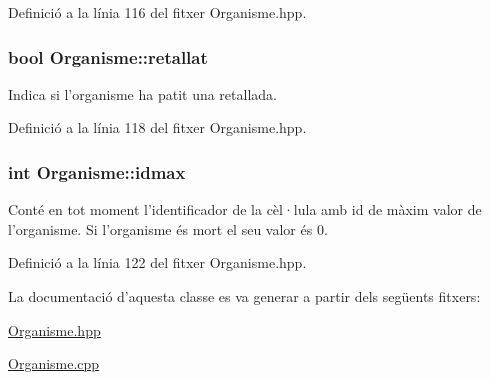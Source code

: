 Definició a la línia 116 del fitxer Organisme.\-hpp.

\hypertarget{class_organisme_acf912225a83570cb68542dcc6709023a}{
\subsubsection[{retallat}]{\setlength{\rightskip}{0pt plus 5cm}bool Organisme\-::retallat\hspace{0.3cm}{\ttfamily [private]}}}\label{class_organisme_acf912225a83570cb68542dcc6709023a}


Indica si l'organisme ha patit una retallada. 



Definició a la línia 118 del fitxer Organisme.\-hpp.

\hypertarget{class_organisme_a09a3d9937c91142b69b8d682c5804f37}{
\subsubsection[{idmax}]{\setlength{\rightskip}{0pt plus 5cm}int Organisme\-::idmax\hspace{0.3cm}{\ttfamily [private]}}}\label{class_organisme_a09a3d9937c91142b69b8d682c5804f37}


Conté en tot moment l'identificador de la cèl·lula amb id de màxim valor de l'organisme. Si l'organisme és mort el seu valor és 0. 



Definició a la línia 122 del fitxer Organisme.\-hpp.



La documentació d'aquesta classe es va generar a partir dels següents fitxers\-:\begin{DoxyCompactItemize}
\item 
\hyperlink{_organisme_8hpp}{Organisme.\-hpp}\item 
\hyperlink{_organisme_8cpp}{Organisme.\-cpp}\end{DoxyCompactItemize}
